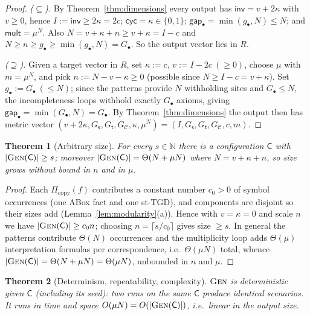 \documentclass{amsart}
\newtheorem{theorem}{Theorem}
\theoremstyle{definition}
\newcommand{\src}{\mathsf{s}}
\newcommand{\trg}{\mathsf{t}}
\newcommand{\Cfg}{\mathsf{C}}
\newcommand{\Cor}{\mathcal{C}}
\newcommand{\Nat}{\mathbb{N}}
\begin{document}
\begin{proof}
\emph{($\subseteq$).} By Theorem~\ref{thm:dimensions} every output has
$\mathsf{inv}=v+2\kappa$ with $v\ge 0$, hence $I:=\mathsf{inv}\ge 2\kappa=2c$;
$\mathsf{cyc}=\kappa\in\{0,1\}$; $\mathsf{gap}_\bullet=\min(g_\bullet,N)\le N$;
and $\mathsf{mult}=\mu^N$. Also $N=v+\kappa+n\ge v+\kappa=I-c$ and $N\ge n\ge g_\bullet
\ge\min(g_\bullet,N)=G_\bullet$. So the output vector lies in $R$.

\emph{($\supseteq$).} Given a target vector in $R$, set $\kappa:=c$,
$v:=I-2c\ (\ge 0)$, choose $\mu$ with $m=\mu^N$, and pick $n:=N-v-\kappa\ge 0$
(possible since $N\ge I-c=v+\kappa$). Set $g_\bullet:=G_\bullet\ (\le N)$;
since the patterns provide $N$ withholding sites and $G_\bullet\le N$, the
incompleteness loops withhold exactly $G_\bullet$ axioms, giving
$\mathsf{gap}_\bullet=\min(G_\bullet,N)=G_\bullet$. By
Theorem~\ref{thm:dimensions} the output then has metric vector
$(v+2\kappa,G_\src,G_\trg,G_\Cor,\kappa,\mu^N)=(I,G_\src,G_\trg,G_\Cor,c,m)$.
\end{proof}

\begin{theorem}[Arbitrary size]\label{thm:size}
For every $s\in\Nat$ there is a configuration $\Cfg$ with
$|\textsc{Gen}(\Cfg)|\ge s$; moreover $|\textsc{Gen}(\Cfg)|=\Theta(N+\mu N)$
where $N=v+\kappa+n$, so size grows without bound in $n$ and in $\mu$.
\end{theorem}

\begin{proof}
Each $\Pi_{\mathrm{copy}}(f)$ contributes a constant number $c_0>0$ of symbol
occurrences (one ABox fact and one st-TGD), and components are disjoint so their
sizes add (Lemma~\ref{lem:modularity}(a)). Hence with $v=\kappa=0$ and scale $n$
we have $|\textsc{Gen}(\Cfg)|\ge c_0 n$; choosing $n=\lceil s/c_0\rceil$ gives
size $\ge s$. In general the patterns contribute $\Theta(N)$ occurrences and the
multiplicity loop adds $\Theta(\mu)$ interpretation formulas per correspondence,
i.e.\ $\Theta(\mu N)$ total, whence $|\textsc{Gen}(\Cfg)|=\Theta(N+\mu N)
=\Theta(\mu N)$, unbounded in $n$ and $\mu$.
\end{proof}

\begin{theorem}[Determinism, repeatability, complexity]\label{thm:complexity}
$\textsc{Gen}$ is deterministic given $\Cfg$ (including its seed): two runs on the
same $\Cfg$ produce identical scenarios. It runs in time and space
$O(\mu N)=O(|\textsc{Gen}(\Cfg)|)$, i.e.\ linear in the output size.
\end{theorem}
\end{document}
